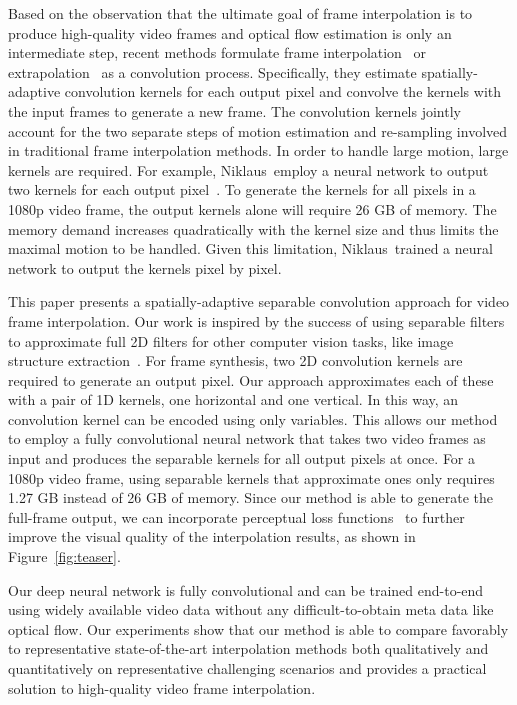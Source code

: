 \documentclass[10pt,twocolumn,letterpaper]{article}
\begin{document}
Based on the observation that the ultimate goal of frame interpolation is to produce high-quality video frames and optical flow estimation is only an intermediate step, recent methods formulate frame interpolation~\cite{Niklaus_CVPR_2017} or extrapolation~\cite{Finn_NIPS_2016, Jia_NIPS_2016, Xue_NIPS_2016} as a convolution process. Specifically, they estimate spatially-adaptive convolution kernels for each output pixel and convolve the kernels with the input frames to generate a new frame. The convolution kernels jointly account for the two separate steps of motion estimation and re-sampling involved in traditional frame interpolation methods. In order to handle large motion, large kernels are required. For example, Niklaus~\etal employ a neural network to output two  kernels for each output pixel~\cite{Niklaus_CVPR_2017}. To generate the kernels for all pixels in a 1080p video frame, the output kernels alone will require 26 GB of memory. The memory demand increases quadratically with the kernel size and thus limits the maximal motion to be handled. Given this limitation, Niklaus~\etal trained a neural network to output the kernels pixel by pixel.

This paper presents a spatially-adaptive separable convolution approach for video frame interpolation. Our work is inspired by the success of using separable filters to approximate full 2D filters for other computer vision tasks, like image structure extraction~\cite{Rigamonti_CVPR_2013}. For frame synthesis, two 2D convolution kernels are required to generate an output pixel. Our approach approximates each of these with a pair of 1D kernels, one horizontal and one vertical. In this way, an  convolution kernel can be encoded using only  variables. This allows our method to employ a fully convolutional neural network that takes two video frames as input and produces the separable kernels for all output pixels at once. For a 1080p video frame, using separable kernels that approximate  ones only requires 1.27 GB instead of 26 GB of memory. Since our method is able to generate the full-frame output, we can incorporate perceptual loss functions~\cite{Dosovitskiy_NIPS_2016, Johnson_ECCV_2016, Ledig_CORR_2016, Sajjadi_CORR_2016, Zhu_ECCV_2016} to further improve the visual quality of the interpolation results, as shown in Figure~\ref{fig:teaser}.

Our deep neural network is fully convolutional and can be trained end-to-end using widely available video data without any difficult-to-obtain meta data like optical flow. Our experiments show that our method is able to compare favorably to representative state-of-the-art interpolation methods both qualitatively and quantitatively on representative challenging scenarios and provides a practical solution to high-quality video frame interpolation. 
\end{document}
